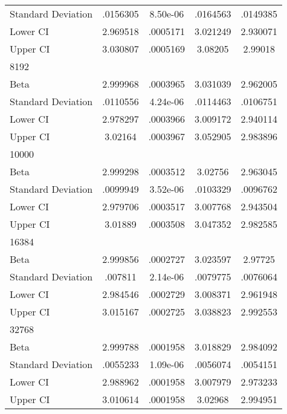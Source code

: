 {\begin{tabular}{l*{1}{cccc}}
Standard Deviation  &    .0156305&    8.50e-06&    .0164563&    .0149385\\
Lower CI            &    2.969518&    .0005171&    3.021249&    2.930071\\
Upper CI            &    3.030807&    .0005169&     3.08205&     2.99018\\
\hline
8192                &            &            &            &            \\
Beta                &    2.999968&    .0003965&    3.031039&    2.962005\\
Standard Deviation  &    .0110556&    4.24e-06&    .0114463&    .0106751\\
Lower CI            &    2.978297&    .0003966&    3.009172&    2.940114\\
Upper CI            &     3.02164&    .0003967&    3.052905&    2.983896\\
\hline
10000               &            &            &            &            \\
Beta                &    2.999298&    .0003512&     3.02756&    2.963045\\
Standard Deviation  &    .0099949&    3.52e-06&    .0103329&    .0096762\\
Lower CI            &    2.979706&    .0003517&    3.007768&    2.943504\\
Upper CI            &     3.01889&    .0003508&    3.047352&    2.982585\\
\hline
16384               &            &            &            &            \\
Beta                &    2.999856&    .0002727&    3.023597&     2.97725\\
Standard Deviation  &     .007811&    2.14e-06&    .0079775&    .0076064\\
Lower CI            &    2.984546&    .0002729&    3.008371&    2.961948\\
Upper CI            &    3.015167&    .0002725&    3.038823&    2.992553\\
\hline
32768               &            &            &            &            \\
Beta                &    2.999788&    .0001958&    3.018829&    2.984092\\
Standard Deviation  &    .0055233&    1.09e-06&    .0056074&    .0054151\\
Lower CI            &    2.988962&    .0001958&    3.007979&    2.973233\\
Upper CI            &    3.010614&    .0001958&     3.02968&    2.994951\\

\end{tabular}}
